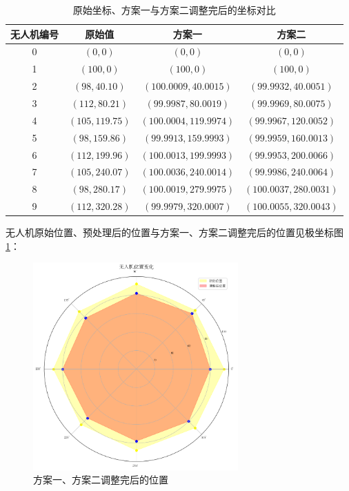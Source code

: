 \documentclass[withoutpreface,bwprint]{cumcmthesis} %
\begin{document}
\begin{table}[H]
  \centering
  \caption{原始坐标、方案一与方案二调整完后的坐标对比}
  \label{tab:original_compare}
  \begin{tabular}{cccc}
    \toprule
    无人机编号 & 原始值 & 方案一 & 方案二 \\
    \midrule
    0 & $(0, 0)$ & $(0, 0)$ & $(0, 0)$ \\
    1 & $(100, 0)$ & $(100, 0)$ & $(100, 0)$ \\
    2 & $(98, 40.10)$ & $(100.0009, 40.0015)$ & $(99.9932, 40.0051)$ \\
    3 & $(112, 80.21)$ & $(99.9987, 80.0019)$ & $(99.9969, 80.0075)$ \\
    4 & $(105, 119.75)$ & $(100.0004, 119.9974)$ & $(99.9967, 120.0052)$ \\
    5 & $(98, 159.86)$ & $(99.9913, 159.9993)$ & $(99.9959, 160.0013)$ \\
    6 & $(112, 199.96)$ & $(100.0013, 199.9993)$ & $(99.9953, 200.0066)$ \\
    7 & $(105, 240.07)$ & $(100.0036, 240.0014)$ & $(99.9986, 240.0064)$ \\
    8 & $(98, 280.17)$ & $(100.0019, 279.9975)$ & $(100.0037, 280.0031)$ \\
    9 & $(112, 320.28)$ & $(99.9979, 320.0007)$ & $(100.0055, 320.0043)$ \\
    \bottomrule
  \end{tabular}
\end{table}

无人机原始位置、预处理后的位置与方案一、方案二调整完后的位置见极坐标图 \ref{q3_3}：

\begin{figure}[H]
  \centering
  \includegraphics[width=0.7\textwidth]{../../figure/q3_3.png} %
  \caption{方案一、方案二调整完后的位置}
  \label{q3_3}
\end{figure}
\end{document}
